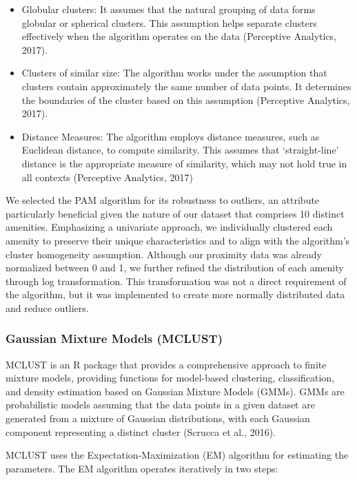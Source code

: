 \documentclass[11pt, a4paper]{article}
\begin{document}
\begin{itemize}
\item Globular clusters: It assumes that the natural grouping of data forms globular or spherical clusters. This assumption helps separate clusters effectively when the algorithm operates on the data (Perceptive Analytics, 2017).
\item Clusters of similar size: The algorithm works under the assumption that clusters contain approximately the same number of data points. It determines the boundaries of the cluster based on this assumption (Perceptive Analytics, 2017).
\item Distance Measures: The algorithm employs distance measures, such as Euclidean distance, to compute similarity. This assumes that `straight-line' distance is the appropriate measure of similarity, which may not hold true in all contexts (Perceptive Analytics, 2017)
\end{itemize}

We selected the PAM algorithm for its robustness to outliers, an attribute particularly beneficial given the nature of our dataset that comprises 10 distinct amenities. Emphasizing a univariate approach, we individually clustered each amenity to preserve their unique characteristics and to align with the algorithm's cluster homogeneity assumption. Although our proximity data was already normalized between 0 and 1, we further refined the distribution of each amenity through log transformation. This transformation was not a direct requirement of the algorithm, but it was implemented to create more normally distributed data and reduce outliers.





\subsubsection{Gaussian Mixture Models (MCLUST)}

MCLUST is an R package that provides a comprehensive approach to finite mixture models, providing functions for model-based clustering, classification, and density estimation based on Gaussian Mixture Models (GMMs). GMMs are probabilistic models assuming that the data points in a given dataset are generated from a mixture of Gaussian distributions, with each Gaussian component representing a distinct cluster (Scrucca et al., 2016).
\par
MCLUST uses the Expectation-Maximization (EM) algorithm for estimating the parameters. The EM algorithm operates iteratively in two steps:
\end{document}
